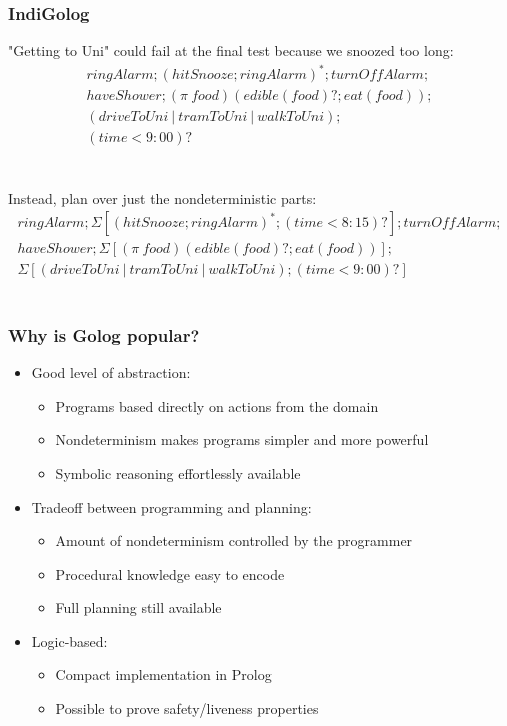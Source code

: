 \documentclass{beamer}
\begin{document}
\begin{frame}
\frametitle{IndiGolog}
"Getting to Uni" could fail at the final test because we snoozed too long:\[
\begin{array}{c}
ringAlarm;(hitSnooze; ringAlarm)^*;turnOffAlarm;\\
haveShower;(\pi\ food)(edible(food)?;eat(food));\\
(driveToUni\ |\ tramToUni\ |\ walkToUni);\\
(time<9:00)?
\end{array}\]\\
\ \\
Instead, plan over just the nondeterministic parts:\[
\begin{array}{c}
ringAlarm;\Sigma[(hitSnooze; ringAlarm)^*;(time<8:15)?];turnOffAlarm;\\
haveShower;\Sigma[(\pi\ food)(edible(food)?;eat(food))];\\
\Sigma[(driveToUni\ |\ tramToUni\ |\ walkToUni);(time<9:00)?]

\end{array}\]\\

\end{frame}

\begin{frame}
\frametitle{Why is Golog popular?}
\begin{itemize}
  \item Good level of abstraction:
  \begin{itemize}
    \item Programs based directly on actions from the domain
    \item Nondeterminism makes programs simpler and more powerful
    \item Symbolic reasoning effortlessly available
  \end{itemize}
  \item Tradeoff between programming and planning:
  \begin{itemize}
    \item Amount of nondeterminism controlled by the programmer
    \item Procedural knowledge easy to encode
    \item Full planning still available
  \end{itemize}
  \item Logic-based:
  \begin{itemize}
    \item Compact implementation in Prolog
    \item Possible to prove safety/liveness properties
  \end{itemize}
\end{itemize}
\end{frame}
\end{document}
